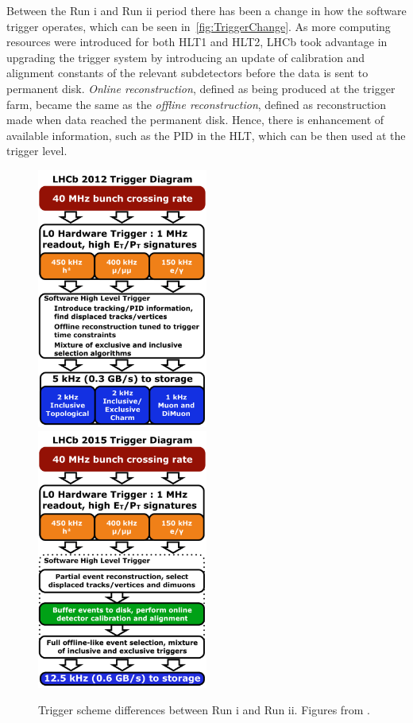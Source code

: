 Between the Run \Rn{1} and Run \Rn{2} period there has been a change in how the software trigger operates, which can be seen in~\autoref{fig:TriggerChange}. As more computing resources were introduced for both \Gls{HLT1} and \Gls{HLT2}, \Gls{LHCb} took advantage in upgrading the trigger system by introducing an update of calibration and alignment constants of the relevant subdetectors before the data is sent to permanent disk. \textit{Online reconstruction}, defined as being produced at the trigger farm, became the same as the \textit{offline reconstruction}, defined as reconstruction made when data reached the permanent disk. Hence, there is enhancement of available information, such as the \Gls{PID} in the \Gls{HLT}, which can be then used at the trigger level. 


\begin{figure}[!h]
	\centering
	\includegraphics[width = 0.5\textwidth]{figs/detector/LHCb_Trigger_RunIAlg.pdf}%
	\includegraphics[width = 0.5\textwidth]{figs/detector/LHCb_Trigger_RunII.pdf}%
	\caption{Trigger scheme differences between Run \Rn{1} and Run \Rn{2}. Figures from \cite{triggerscheme}.}  
	\label{fig:TriggerChange}
\end{figure}


